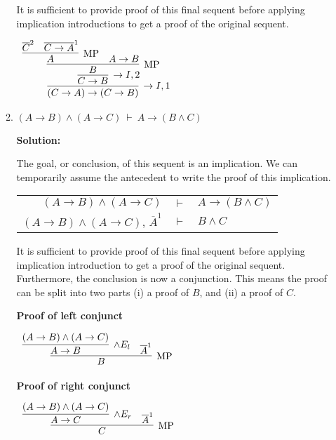 \documentclass[11pt]{report}
\newcommand{\temp}[2]{{\overline{#2}}^{#1}}
\begin{document}
\begin{enumerate}
\begin{enumerate}
		It is sufficient to provide proof of this final sequent before applying implication introductions to get a proof of the original sequent.

		\begin{center}
			$\begin{array}{c}
				\infer[\to I, 1]{(C \to A) \to (C \to B)}
					{\infer[\to I, 2]{C \to B}
						{\infer[\MP]{B}
							{\infer[\MP]{A}
								{\temp{2}{C}
								&
								\temp{1}{C \to A}}
							&
							A \to B}}}
			\end{array}$

		\end{center}
	
		\item $(A \to B) \land (A \to C) \ \vdash \ A \to (B \land C)$
		
		\textbf{Solution:}

		The goal, or conclusion, of this sequent is an implication. We can temporarily assume the antecedent to write the proof of this implication. 

		\begin{center}
			\begin{tabular}{r c l}
				$(A \to B) \land (A \to C)$ & $\vdash$ & $A \to (B \land C)$ \\
				$(A \to B) \land (A \to C)$, $\temp{1}{A}$ & $\vdash$ & $B \land C$
			\end{tabular}
		\end{center}

		It is sufficient to provide proof of this final sequent before applying implication introduction to get a proof of the original sequent. Furthermore, the conclusion is now a conjunction. This means the proof can be split into two parts (i) a proof of $B$, and (ii) a proof of $C$. 

		\textbf{Proof of left conjunct}

		\begin{center}
			$\begin{array}{c} 
				\infer[\MP]{B}
					{\infer[\land E_{l}]{A \to B}{(A \to B) \land (A \to C)}
					&
					\temp{1}{A}}
			\end{array}$
		\end{center}

		\textbf{Proof of right conjunct}

		\begin{center}
			$\begin{array}{c} 
				\infer[\MP]{C}
					{\infer[\land E_{r}]{A \to C}{(A \to B) \land (A \to C)}
					&
					\temp{1}{A}}
			\end{array}$
		\end{center}		


\end{enumerate}
\end{enumerate}
\end{document}
